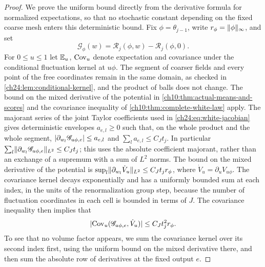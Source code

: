 \begin{proof}
We prove the uniform bound directly from the derivative formula for normalized expectations, so that no stochastic constant depending on the fixed coarse mesh enters this deterministic bound. Fix $\phi=\theta_{j-1}$, write $r_\phi=\lVert \phi\rVert_\infty$, and set
\[
 \mathscr G_\phi(w)=\mathscr R_j(\phi,w)-\mathscr R_j(\phi,0).
\]
For $0\le u\le1$ let $\mathbb E_u$, $\operatorname{Cov}_u$ denote expectation and covariance under the conditional fluctuation kernel at $u\phi$. The segment of coarser fields and every point of the free coordinates remain in the same domain, as checked in \cref{ch24:lem:conditional-kernel}, and the product of balls does not change. The bound on the mixed derivative of the potential in \cref{ch10:thm:actual-means-and-scores} and the covariance inequality of \cref{ch10:thm:complete-white-law} apply. The majorant series of the joint Taylor coefficients used in \eqref{ch24:eq:white-jacobian} gives deterministic envelopes $a_{e,l}\ge0$ such that, on the whole product and the whole segment, $\lvert \partial_{w_l}\mathscr G_{u\phi,e}\rvert\le a_{e,l}$ and $\sum_la_{e,l}\le C_Jt_j$. In particular $\sum_l\lVert \partial_{w_l}\mathscr G_{u\phi,e}\rVert_{L^2}\le C_Jt_j$; this uses the absolute coefficient majorant, rather than an exchange of a supremum with a sum of $L^2$ norms. The bound on the mixed derivative of the potential is $\sup_l\lVert \partial_{w_l}\dot V_u\rVert_{L^2}\le C_Jt_jr_\phi$, where $\dot V_u=\partial_uV_{u\phi}$. The covariance kernel decays exponentially and has a uniformly bounded sum at each index, in the units of the renormalization group step, because the number of fluctuation coordinates in each cell is bounded in terms of $J$. The covariance inequality then implies that
\begin{equation}\label{ch24:eq:mean-score-covariance}
 \lvert \operatorname{Cov}_u(\mathscr G_{u\phi,e},\dot V_u)\rvert\le C_Jt_j^2r_\phi.
\end{equation}
To see that no volume factor appears, we sum the covariance kernel over its second index first, using the uniform bound on the mixed derivative there, and then sum the absolute row of derivatives at the fixed output $e$.


\end{proof}
